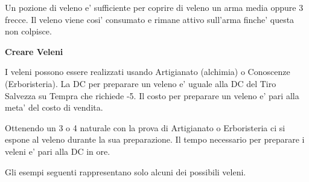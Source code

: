 \documentclass[a4paper,11pt,twoside,openany]{dndbook}
\begin{document}
Un pozione di veleno e' sufficiente per coprire di veleno un arma media oppure 3 frecce. Il veleno viene cosi' consumato e rimane attivo sull'arma finche' questa non colpisce.

\textbf{Creare Veleni}

I veleni possono essere realizzati usando Artigianato (alchimia) o Conoscenze (Erboristeria). La DC per preparare un veleno e' uguale alla DC del Tiro Salvezza su Tempra che richiede -5. Il costo per preparare un veleno e' pari alla meta' del costo di vendita.

Ottenendo un 3 o 4 naturale con la prova di Artigianato o Erboristeria ci si espone al veleno durante la sua preparazione. Il tempo necessario per preparare i veleni e' pari alla DC in ore. 

Gli esempi seguenti rappresentano solo alcuni dei possibili veleni.

\bigskip
\end{document}
